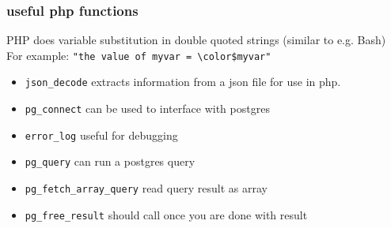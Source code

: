 \documentclass[12pt]{article}
\begin{document}
\subsubsection{useful php functions}
PHP does variable substitution in double quoted strings (similar to e.g. Bash)
For example: \lstinline{"the value of myvar = \color$myvar"}
\begin{itemize}
  \item {
    \lstinline{json_decode} extracts information from a json file for use in php.
  }
  \item {
    \lstinline{pg_connect} can be used to interface with postgres
  }
  \item {
    \lstinline{error_log} useful for debugging
  }
  \item {
    \lstinline{pg_query} can run a postgres query
  }
  \item {
    \lstinline{pg_fetch_array_query} read query result as array
  }
  \item {
    \lstinline{pg_free_result} should call once you are done with result
  }
\end{itemize}
\end{document}
